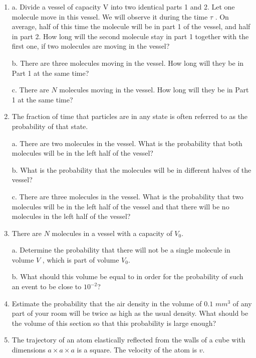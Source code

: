 \documentclass{article}
\begin{document}
\begin{enumerate}[label=5.8.\arabic*]


\item a. Divide a vessel of capacity V into two identical parts 1 and 2. Let one molecule move in this vessel. We will observe it during the time $\tau$ . On average, half of this time the molecule will be in part 1 of the vessel, and half in part 2. How long will the second molecule stay in part 1 together with the first one, if two molecules are moving in the vessel? 

b. There are three molecules moving in the vessel. How long will they be in Part 1 at the same time? 

c. There are $N$ molecules moving in the vessel. How long will they be in Part 1 at the same time?

\item The fraction of time that particles are in any state is often referred to as the probability of that state.

a. There are two molecules in the vessel. What is the probability that both molecules will be in the left half of the vessel?

b. What is the probability that the molecules will be in different halves of the vessel? 

c. There are three molecules in the vessel. What is the probability that two molecules will be in the left half of the vessel and that there will be no molecules in the left half of the vessel?

\item There are $N$ molecules in a vessel with a capacity of $V_0$. 

a. Determine the probability that there will not be a single molecule in volume $V$ , which is part of volume $V_0$.

b. What should this volume be equal to in order for the probability of such an event to be close to $10^{-2}$?

\item Estimate the probability that the air density in the volume of $0.1$ $mm^3$ of any part of your room will be twice as high as the usual density. What should be the volume of this section so that this probability is large enough?

\item The trajectory of an atom elastically reflected from the walls of a cube with dimensions $a \times a \times a$ is a square. The velocity of the atom is $v$. 


\end{enumerate}
\end{document}

